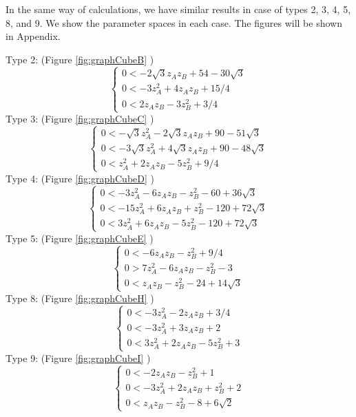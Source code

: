 \documentclass[suppldata, dvipdfmx]{interact}
\theoremstyle{plain}%
\theoremstyle{definition}
\theoremstyle{remark}
\theoremstyle{problemstyle}
\begin{document}
In the same way of calculations, we have similar results in case of types 2, 3, 4, 5, 8, and 9.  We show the parameter spaces in each case.  The figures will be shown in Appendix.

\noindent Type 2: (Figure \ref{fig:graphCubeB} )
 \[
 \begin{cases}
   0 < -2\sqrt{3} z_A z_B + 54 - 30\sqrt{3} \\
   0 <-3z_A^2 + 4 z_A z_B + 15/4 \\
   0 < 2z_A z_B - 3z_B^2 + 3/4 
  \end{cases}
\]
Type 3: (Figure \ref{fig:graphCubeC} )
 \[
 \begin{cases}
   0 < -\sqrt{3}z_A^2 - 2\sqrt{3}z_Az_B + 90 - 51\sqrt{3} \\
   0 < -3\sqrt{3}z_A^2 + 4\sqrt{3}z_A z_B + 90 - 48\sqrt{3} \\
   0 < z_A^2 + 2 z_A z_B - 5z_B^2 + 9/4 
  \end{cases}
\]
  Type 4: (Figure \ref{fig:graphCubeD} )
 \[
 \begin{cases}
   0 < -3z_A^2 - 6z_A z_B - z_B^2 -60 +36\sqrt{3} \\
   0 < -15 z_A^2 + 6z_Az_B + z_B^2 - 120 + 72\sqrt{3} \\
   0<  3z_A^2 + 6z_Az_B - 5z_B^2 - 120 + 72 \sqrt{3} 
  \end{cases}
\]
  Type 5: (Figure \ref{fig:graphCubeE} )
 \[
 \begin{cases}
   0 <  -6z_Az_B - z_B^2 + 9/4 \\
   0 > 7z_A^2 - 6z_Az_B - z_B^2 - 3 \\
   0 < z_Az_B - z_B^2 - 24 + 14\sqrt{3} 
  \end{cases}
\]
 Type 8: (Figure \ref{fig:graphCubeH} )
 \[
 \begin{cases}
    0 <-3z_A^2 - 2z_Az_B + 3/4 \\
    0 <-3z_A^2 + 3 z_Az_B + 2 \\
    0 < 3z_A^2 + 2z_Az_B -5z_B^2 + 3 
  \end{cases}
\]
 Type 9: (Figure \ref{fig:graphCubeI} )
 \[
 \begin{cases}
   0 < -2z_Az_B - z_B^2 + 1 \\
   0 < -3z_A^2 + 2 z_A z_B + z_B^2 + 2 \\
   0 < z_Az_B - z_B^2 - 8 + 6\sqrt{2} 
  \end{cases}
\]
\end{document}
